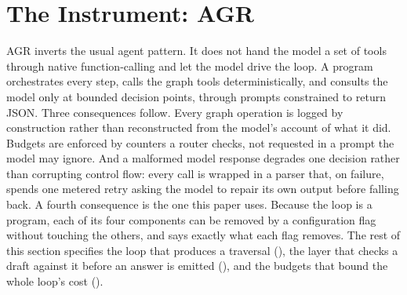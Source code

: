 %
%
%
%

\section{The Instrument: AGR}\label{sec:framework}

AGR inverts the usual agent pattern. It does not hand the model a set of
tools through native function-calling and let the model drive the loop.
A program orchestrates every step, calls the graph tools
deterministically, and consults the model only at bounded decision
points, through prompts constrained to return JSON. Three consequences
follow. Every graph operation is logged by construction rather than
reconstructed from the model's account of what it did. Budgets are
enforced by counters a router checks, not requested in a prompt the
model may ignore. And a malformed model response degrades one decision
rather than corrupting control flow: every call is wrapped in a parser
that, on failure, spends one metered retry asking the model to repair
its own output before falling back. A fourth consequence is the one this
paper uses. Because the loop is a program, each of its four components
can be removed by a configuration flag without touching the others, and
 says exactly what each flag removes. The rest of this
section specifies the loop that produces a traversal
(), the layer that checks a draft against it
before an answer is emitted (), and the budgets
that bound the whole loop's cost ().

